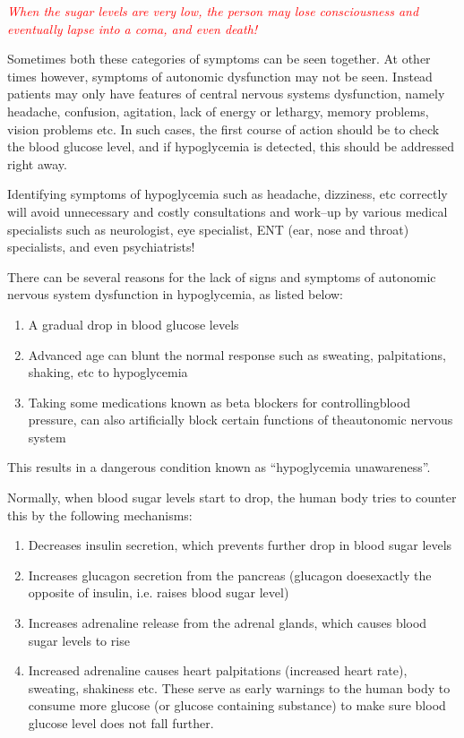 \textcolor{red}{\textit{When the sugar levels are very low, the person may lose consciousness and eventually lapse into a coma, and even death!}}

Sometimes both these categories of symptoms can be seen together. At other times however, symptoms of autonomic dysfunction may not be seen. Instead patients may only have features of central nervous systems dysfunction, namely headache, confusion, agitation, lack of energy or lethargy, memory problems, vision problems etc. In such cases, the first course of action should be to check the blood glucose level, and if hypoglycemia is detected, this should be addressed right away.

Identifying symptoms of hypoglycemia such as headache, dizziness, etc correctly will avoid unnecessary and costly consultations and work–up by various medical specialists such as neurologist, eye specia\-list, ENT (ear, nose and throat) specialists, and even psychiatrists!

There can be several reasons for the lack of signs and symptoms of autonomic nervous system dysfunction in hypoglycemia, as listed below:
\begin{enumerate}[•]
\itemsep=0pt
\item A gradual drop in blood glucose levels
\item Advanced age can blunt the normal response such as sweating, palpi\-tations, shaking, etc to hypoglycemia
\item Taking some medications known as beta blockers for controlling\break blood pressure, can also artificially block certain functions of the\break autonomic nervous system
\end{enumerate}

\noindent This results in a dangerous condition known as “hypoglycemia unawa\-reness”.


Normally, when blood sugar levels start to drop, the human body tries to counter this by the following mechanisms:
\begin{enumerate}[•]
\itemsep=0pt
\item Decreases insulin secretion, which prevents further drop in blood sugar levels
\item Increases glucagon secretion from the pancreas (glucagon does\break exactly the opposite of insulin, i.e. raises blood sugar level)
\item Increases adrenaline release from the adrenal glands, which causes blood sugar levels to rise
\item Increased adrenaline causes heart palpitations (increased heart rate), sweating, shakiness etc. These serve as early warnings to the human body to consume more glucose (or glucose containing substance) to make sure blood glucose level does not fall further.
\end{enumerate}

